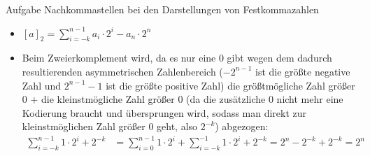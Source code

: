 \begin{frame}[allowframebreaks]{Aufgabe \thesection}{Nachkommastellen bei den Darstellungen von Festkommazahlen}
    \begin{solution}
        \begin{itemize}
            \item $\displaystyle [a]_{2}=\sum_{i=-k}^{n-1}a_{i}\cdot2^{i}-a_{n}\cdot2^{n}$
            \item Beim \alert{Zweierkomplement} wird, da es nur eine $0$ gibt wegen dem dadurch resultierenden asymmetrischen Zahlenbereich ($-2^{n-1}$ ist die größte negative Zahl und $2^{n-1}-1$ ist die größte positive Zahl) die größtmögliche Zahl größer $0$ + die kleinstmögliche Zahl größer $0$ (da die zusätzliche $0$ nicht mehr eine Kodierung braucht und übersprungen wird, sodass man direkt zur kleinstmöglichen Zahl größer $0$ geht, also $2^{-k}$) abgezogen:
            \begin{align*}
            \sum_{i=-k}^{n-1}1\cdot2^{i} + 2^{-k} &= \sum_{i=0}^{n-1}1\cdot2^{i} + \sum_{i=-k}^{-1}1\cdot2^{i} + 2^{-k} = 2^n-2^{-k} + 2^{-k} = 2^n
            \end{align*}
        \end{itemize}
    \end{solution}
\end{frame}

